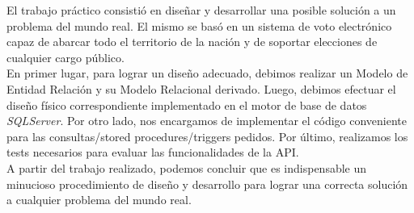 \documentclass[10pt,a4paper]{article}
\begin{document}
El trabajo práctico consistió en diseñar y desarrollar una posible solución a un problema del mundo real. El mismo se basó en un sistema de voto electrónico capaz de abarcar todo el territorio de la nación y de soportar elecciones de cualquier cargo público.\\
En primer lugar, para lograr un diseño adecuado, debimos realizar un Modelo de Entidad Relación y su Modelo Relacional derivado.
Luego, debimos efectuar el diseño físico correspondiente implementado en el motor de base de datos \textit{SQLServer}.
Por otro lado, nos encargamos de implementar el código conveniente para las consultas/stored procedures/triggers pedidos.
Por último, realizamos los tests necesarios para evaluar las funcionalidades de la API.\\
A partir del trabajo realizado, podemos concluir que es indispensable un minucioso procedimiento de diseño y desarrollo para lograr una correcta solución a cualquier problema del mundo real. 
\end{document}
